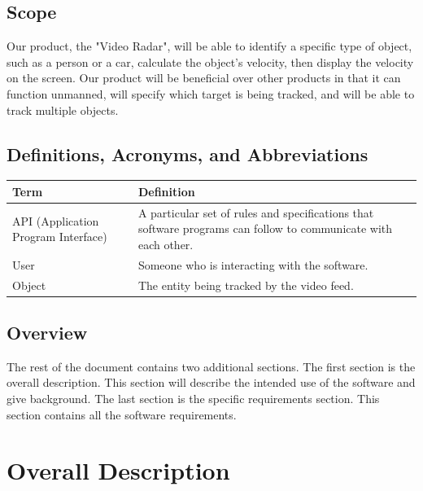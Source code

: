 \documentclass[letterpaper,10pt,onecolumn,draftclsnofoot]{IEEEtran}
\begin{document}
\subsection{Scope}
Our product, the "Video Radar", will be able to identify a specific type of object, such as a person or a car, calculate the object's velocity, then display the velocity on the screen.
Our product will be beneficial over other products in that it can function unmanned, will specify which target is being tracked, and will be able to track multiple objects.
\subsection{Definitions, Acronyms, and Abbreviations}
\begin{tabular}{|p{4cm}|p{12cm}|}
	\hline
	\textbf{Term} & \textbf{Definition} \\
	\hline
	API (Application Program Interface) & A particular set of rules and specifications that software programs can follow to communicate with each other. \\
	\hline
	User & Someone who is interacting with the software. \\
	\hline
	Object & The entity being tracked by the video feed.  \\
	\hline
	
\end{tabular}



\subsection{Overview}
The rest of the document contains two additional sections.
The first section is the overall description.
This section will describe the intended use of the software and give background.
The last section is the specific requirements section.
This section contains all the software requirements.

\section{Overall Description}
\end{document}
